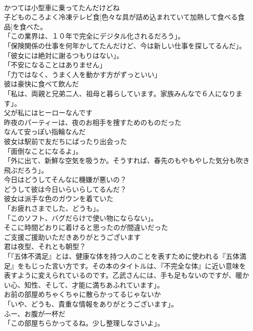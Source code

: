\documentclass[8pt]{extreport}
\begin{document}
\begin{CJK}{UTF8}{min}
\\	かつては小型車に乗ってたんだけどね	
\\	子どものころよく冷凍テレビ食[色々な具が詰め込まれていて加熱して食べる食品]を食べた。	
\\	「この業界は、１０年で完全にデジタル化されるだろう」。	
\\	「保険関係の仕事を何年かしてたんだけど、今は新しい仕事を探してるんだ」。	
\\	「彼女には絶対に謝るつもりはない」。	
\\	「不安になることはありません」	
\\	「力ではなく、うまく人を動かす方がずっといい」	
\\	彼は豪快に食べて飲んだ	
\\	「私は、両親と兄弟二人、祖母と暮らしています。家族みんなで６人になります」。	
\\	父が私にはヒーローなんです	
\\	昨夜のパーティーは、夜のお相手を捜すためのものだった	
\\	なんて安っぽい指輪なんだ	
\\	彼女は駅前で友だちにばったり出会った	
\\	「面倒なことになるよ」。	
\\	「外に出て、新鮮な空気を吸うか。そうすれば、春先のもやもやした気分も吹き飛ぶだろう」。	
\\	今日はどうしてそんなに機嫌が悪いの？	
\\	どうして彼は今日いらいらしてるんだ？	
\\	彼女は派手な色のガウンを着ていた	
\\	「お疲れさまでした、どうも」。	
\\	「このソフト、バグだらけで使い物にならない」。	
\\	そこに時間どおりに着けると思ったのが間違いだった	
\\	ご支援ご援助いただきありがとうございます	
\\	君は夜型、それとも朝型？	
\\	「『五体不満足』とは、健康な体を持つ人のことを表すために使われる『五体満足』をもじった言い方です。その本のタイトルは、『不完全な体』に近い意味を表すように変えられているのです。乙武さんには、手も足もないのですが、暖かい心、知性、そして、才能に満ちあふれています」。	
\\	お前の部屋めちゃくちゃに散らかってるじゃないか	
\\	「いや、どうも、貴重な情報をありがとうございます」。	
\\	ふー、お腹が一杯だ	
\\	「この部屋ちらかってるね。少し整理しなさいよ」。	

\end{CJK}
\end{document}
